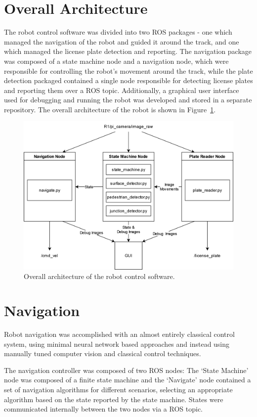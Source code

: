\documentclass[titlepage, twocolumn]{article}
\begin{document}
\section{Overall Architecture}

    The robot control software was divided into two ROS packages - one which managed the navigation of the robot and guided it around the track, and one which managed the license plate detection and reporting. The navigation package was composed of a state machine node and a navigation node, which were responsible for controlling the robot's movement around the track, while the plate detection packaged contained a single node responsible for detecting license plates and reporting them over a ROS topic. Additionally, a graphical user interface used for debugging and running the robot was developed and stored in a separate repository. The overall architecture of the robot is shown in Figure~\ref{fig:architecture}. 

    \begin{figure}
        \centering
        \includegraphics[width=0.9\linewidth]{architecture.png}
        \caption{Overall architecture of the robot control software.}
        \label{fig:architecture}
    \end{figure}

\section{Navigation}
    Robot navigation was accomplished with an almost entirely classical control system, using minimal neural network based approaches and instead using manually tuned computer vision and classical control techniques. 

    The navigation controller was composed of two ROS nodes: The `State Machine' node was composed of a finite state machine and the `Navigate' node contained a set of navigation algorithms for different scenarios, selecting an appropriate algorithm based on the state reported by the state machine. States were communicated internally between the two nodes via a ROS topic.
    
\end{document}
